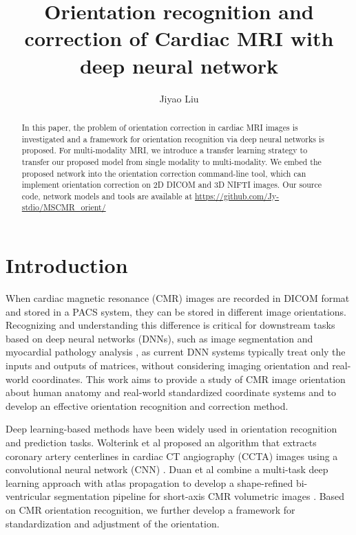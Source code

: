 \documentclass[runningheads]{llncs}
\begin{document}
\title{Orientation recognition and correction of Cardiac MRI with deep neural network}

\author{Jiyao Liu 
}

\maketitle              %

\begin{abstract}

In this paper, the problem of orientation correction in cardiac MRI images is investigated and a framework for orientation recognition via deep neural networks is proposed. For  multi-modality MRI, we introduce a transfer learning strategy to transfer our proposed model from single modality to multi-modality. We embed the proposed network into the orientation correction command-line tool, which can implement orientation correction on 2D DICOM and 3D NIFTI images. Our source code, network models and tools are available at \url{https://github.com/Jy-stdio/MSCMR\_orient/}


\end{abstract}
\section{Introduction}

When cardiac magnetic resonance (CMR) images are recorded in DICOM format and stored in a PACS system, they can be stored in different image orientations. Recognizing and understanding this difference is critical for downstream tasks based on deep neural networks (DNNs), such as image segmentation \cite{seg1} and myocardial pathology analysis \cite{anas1}, as current DNN systems typically treat only the inputs and outputs of matrices, without considering imaging orientation and real-world coordinates. This work aims to provide a study of CMR image orientation 
about human anatomy and real-world standardized coordinate systems and to develop an effective orientation recognition and correction method.

Deep learning-based methods have been widely used in orientation recognition and prediction tasks. Wolterink et al proposed an algorithm that extracts coronary artery centerlines in cardiac CT angiography (CCTA) images using a convolutional neural network (CNN) \cite{8}. Duan et al combine a multi-task deep learning approach with atlas propagation to develop a shape-refined bi-ventricular segmentation pipeline for short-axis CMR volumetric images \cite{3}. Based on CMR orientation recognition, we further develop a framework for standardization and adjustment of the orientation.
\end{document}
